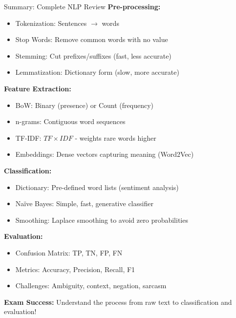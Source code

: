 \documentclass[8pt]{beamer}
\begin{document}
	
	\begin{frame}{Summary: Complete NLP Review}
		\fontsize{6.5}{7.5}\selectfont
		\textbf{\textcolor{myblue}{Pre-processing:}}
		\begin{itemize}
			\item \textcolor{myblue}{Tokenization:} Sentences $\to$ words
			\item \textcolor{myblue}{Stop Words:} Remove common words with no value
			\item \textcolor{myblue}{Stemming:} Cut prefixes/suffixes (fast, less accurate)
			\item \textcolor{myblue}{Lemmatization:} Dictionary form (slow, more accurate)
		\end{itemize}
		
		\vspace{0.1cm}
		\textbf{\textcolor{myblue}{Feature Extraction:}}
		\begin{itemize}
			\item \textcolor{myblue}{BoW:} Binary (presence) or Count (frequency)
			\item \textcolor{myblue}{n-grams:} Contiguous word sequences
			\item \textcolor{myblue}{TF-IDF:} $TF \times IDF$ - weights rare words higher
			\item \textcolor{myblue}{Embeddings:} Dense vectors capturing meaning (Word2Vec)
		\end{itemize}
		
		\vspace{0.1cm}
		\textbf{\textcolor{myblue}{Classification:}}
		\begin{itemize}
			\item \textcolor{myblue}{Dictionary:} Pre-defined word lists (sentiment analysis)
			\item \textcolor{myblue}{Naïve Bayes:} Simple, fast, generative classifier
			\item \textcolor{myblue}{Smoothing:} Laplace smoothing to avoid zero probabilities
		\end{itemize}
		
		\vspace{0.1cm}
		\textbf{\textcolor{myblue}{Evaluation:}}
		\begin{itemize}
			\item \textcolor{myblue}{Confusion Matrix:} TP, TN, FP, FN
			\item \textcolor{myblue}{Metrics:} Accuracy, Precision, Recall, F1
			\item \textcolor{myblue}{Challenges:} Ambiguity, context, negation, sarcasm
		\end{itemize}
		
		\textcolor{myred}{\textbf{Exam Success:}} Understand the process from raw text to classification and evaluation!
	\end{frame}
	
\end{document}
